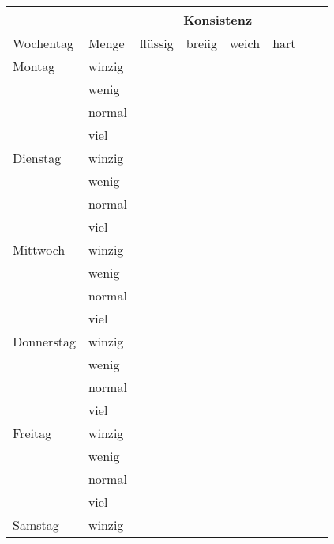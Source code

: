 \documentclass[11pt,a4paper]{article}
\begin{document}
\pagestyle{empty}
\centering
\begin{tabular}{l|l|l|l|l|l|p{3cm}|p{3cm}}
  \toprule
  \multicolumn{2}{c}{} & \multicolumn{4}{|c|}{Konsistenz} & & \\
  \midrule
  Wochentag  & Menge   & flüssig & breiig & weich & hart  & & \\
  \midrule
  Montag     & winzig  &         &        &       &       & & \\
             & wenig   &         &        &       &       & & \\
             & normal  &         &        &       &       & & \\
             & viel    &         &        &       &       & & \\
  \midrule
  Dienstag   & winzig  &         &        &       &       & & \\
             & wenig   &         &        &       &       & & \\
             & normal  &         &        &       &       & & \\
             & viel    &         &        &       &       & & \\
  \midrule
  Mittwoch   & winzig  &         &        &       &       & & \\
             & wenig   &         &        &       &       & & \\
             & normal  &         &        &       &       & & \\
             & viel    &         &        &       &       & & \\
  \midrule
  Donnerstag & winzig  &         &        &       &       & & \\
             & wenig   &         &        &       &       & & \\
             & normal  &         &        &       &       & & \\
             & viel    &         &        &       &       & & \\
  \midrule
  Freitag    & winzig  &         &        &       &       & & \\
             & wenig   &         &        &       &       & & \\
             & normal  &         &        &       &       & & \\
             & viel    &         &        &       &       & & \\
  \midrule
  Samstag    & winzig  &         &        &       &       & & \\

\end{tabular}
\end{document}
